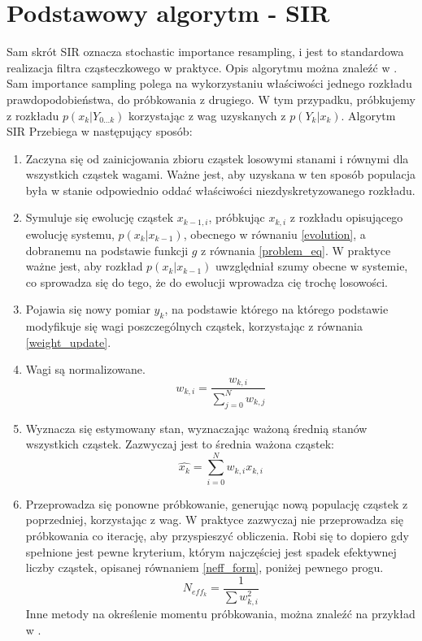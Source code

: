 \section{Podstawowy algorytm - SIR} \label{basic_algorithm}
Sam skrót SIR oznacza stochastic importance resampling, i jest to standardowa realizacja filtra cząsteczkowego w praktyce. Opis algorytmu można znaleźć w \cite{wiki_pf}. Sam importance sampling polega na wykorzystaniu właściwości jednego rozkładu prawdopodobieństwa, do próbkowania z drugiego. W tym przypadku, próbkujemy z rozkładu $p(x_k|Y_{0...k})$ korzystając z wag uzyskanych z $p(Y_k|x_k)$.
Algorytm SIR Przebiega w następujący sposób:
\begin{enumerate}[label=(\alph*)]
	\item Zaczyna się od zainicjowania zbioru cząstek losowymi stanami i równymi dla wszystkich cząstek wagami. Ważne jest, aby uzyskana w ten sposób populacja była w stanie odpowiednio oddać właściwości niezdyskretyzowanego rozkładu. \label{pf_init_step}
	
	\item Symuluje się ewolucję cząstek $x_{k-1,i}$, próbkując $x_{k,i}$ z rozkładu opisującego ewolucję systemu, $p(x_k|x_{k-1})$, obecnego w równaniu \ref{evolution}, a dobranemu na podstawie funkcji $g$ z równania \ref{problem_eq}. W praktyce ważne jest, aby rozkład $p(x_k|x_{k-1})$ uwzględniał szumy obecne w systemie, co sprowadza się do tego, że do ewolucji wprowadza cię trochę losowości. \label{pf_drift_step}
	
	\item Pojawia się nowy pomiar $y_k$, na podstawie którego na którego podstawie modyfikuje się wagi poszczególnych cząstek, korzystając z równania \ref{weight_update}. \label{pf_reweight_step}

	\item Wagi są normalizowane. \label{pf_weight_normalization_step}
	\begin{equation}
		w_{k,i}=\frac{w_{k,i}}{\sum_{j=0}^{N} w_{k,j}}
	\end{equation}

	\item Wyznacza się estymowany stan, wyznaczając ważoną średnią stanów wszystkich cząstek. Zazwyczaj jest to średnia ważona cząstek: \label{pf_est_step}
	\begin{equation}
		\hat{x_k} = \sum_{i=0}^{N} w_{k,i} x_{k,i}
	\end{equation}
	\item Przeprowadza się ponowne próbkowanie, generując nową populację cząstek z poprzedniej, korzystając z wag. W praktyce zazwyczaj nie przeprowadza się próbkowania co iterację, aby przyspieszyć obliczenia. Robi się to dopiero gdy spełnione jest pewne kryterium, którym najczęściej jest spadek efektywnej liczby cząstek, opisanej równaniem \ref{neff_form}, poniżej pewnego progu.
	\begin{equation}\label{neff_form}
		N_{eff_k} = \dfrac{1}{\sum w_{k,i}^2}
	\end{equation}
	Inne metody na określenie momentu próbkowania, można znaleźć na przykład w \cite{adaptive_resampling}.\label{resampling_step}
\end{enumerate}
